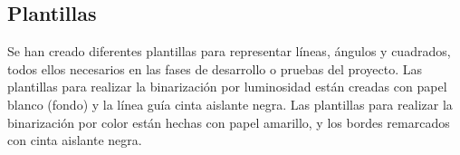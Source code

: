 \subsection{Plantillas}
Se han creado diferentes plantillas para representar líneas, ángulos y cuadrados, todos ellos necesarios en las fases de desarrollo o pruebas del proyecto. Las plantillas para realizar la binarización por luminosidad están creadas con papel blanco (fondo) y la línea guía cinta aislante negra. Las plantillas para realizar la binarización por color están hechas con papel amarillo, y los bordes remarcados con cinta aislante negra.

